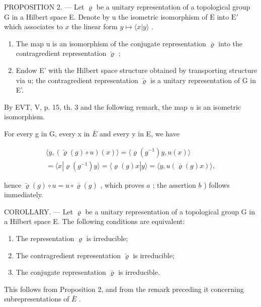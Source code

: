 PROPOSITION 2. --- Let \(\varrho\) be a unitary representation of a topological group G in a Hilbert space E. Denote by u the isometric isomorphism of \(\overline{\mathrm{E}}\) into \(\mathrm{E}'\) which associates to \(x\) the linear form \(y\mapsto \langle x|y\rangle\) .

\begin{enumerate}
\def\labelenumi{\alph{enumi})}
\item
  The map u is an isomorphism of the conjugate representation \(\overline{\varrho}\) into the contragredient representation \(\breve{\varrho}\) ;
\item
  Endow E' with the Hilbert space structure obtained by transporting structure via u; the contragredient representation \(\breve{\varrho}\) is a unitary representation of G in E'.
\end{enumerate}

By EVT, V, p. 15, th. 3 and the following remark, the map \(u\) is an isometric isomorphism.

For every g in G, every x in \(\overline{E}\) and every y in E, we have

\[
\begin{array}{c} \langle y, (\breve {\varrho} (g) \circ u) (x) \rangle = \langle \varrho (g ^ {- 1}) y, u (x) \rangle \\ = \langle x | \varrho (g ^ {- 1}) y \rangle = \langle \varrho (g) x | y \rangle = \langle y, u (\overline {{\varrho}} (g) x) \rangle , \end{array}
\]

hence \(\breve{\varrho}(g) \circ u = u \circ \overline{\varrho}(g)\) , which proves \(a\) ; the assertion \(b\) ) follows immediately.

COROLLARY. --- Let \(\varrho\) be a unitary representation of a topological group G in a Hilbert space E. The following conditions are equivalent:

\begin{enumerate}
\def\labelenumi{(\roman{enumi})}
\item
  The representation \(\varrho\) is irreducible;
\item
  The contragredient representation \(\breve{\varrho}\) is irreducible;
\item
  The conjugate representation \(\overline{\varrho}\) is irreducible.
\end{enumerate}

This follows from Proposition 2, and from the remark preceding it concerning subrepresentations of \(\overline{E}\) .

